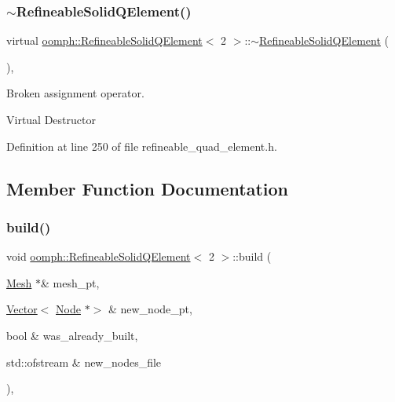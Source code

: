 \subsubsection{\texorpdfstring{$\sim$\+Refineable\+Solid\+Q\+Element()}{~RefineableSolidQElement()}}
{\footnotesize\ttfamily virtual \hyperlink{classoomph_1_1RefineableSolidQElement}{oomph\+::\+Refineable\+Solid\+Q\+Element}$<$ 2 $>$\+::$\sim$\hyperlink{classoomph_1_1RefineableSolidQElement}{Refineable\+Solid\+Q\+Element} (\begin{DoxyParamCaption}{ }\end{DoxyParamCaption})\hspace{0.3cm}{\ttfamily [inline]}, {\ttfamily [virtual]}}



Broken assignment operator. 

Virtual Destructor 

Definition at line 250 of file refineable\+\_\+quad\+\_\+element.\+h.



\subsection{Member Function Documentation}
\mbox{\label{classoomph_1_1RefineableSolidQElement_3_012_01_4_abebfabc831b862c49dc181ada6a7ca05}} 
\subsubsection{\texorpdfstring{build()}{build()}}
{\footnotesize\ttfamily void \hyperlink{classoomph_1_1RefineableSolidQElement}{oomph\+::\+Refineable\+Solid\+Q\+Element}$<$ 2 $>$\+::build (\begin{DoxyParamCaption}\item[{\hyperlink{classoomph_1_1Mesh}{Mesh} $\ast$\&}]{mesh\+\_\+pt,  }\item[{\hyperlink{classoomph_1_1Vector}{Vector}$<$ \hyperlink{classoomph_1_1Node}{Node} $\ast$$>$ \&}]{new\+\_\+node\+\_\+pt,  }\item[{bool \&}]{was\+\_\+already\+\_\+built,  }\item[{std\+::ofstream \&}]{new\+\_\+nodes\+\_\+file }\end{DoxyParamCaption})\hspace{0.3cm}{\ttfamily [inline]}, {\ttfamily [virtual]}}



